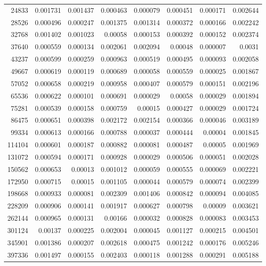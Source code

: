 \begin{tabular}{r r r r r r r r}
24833 & 0.001731 & 0.001437 & 0.000463 & 0.000079 & 0.000451 & 0.000171 & 0.002644 \\
28526 & 0.000496 & 0.000247 & 0.001375 & 0.001314 & 0.000372 & 0.000166 & 0.002242 \\
32768 & 0.001402 & 0.001023 & 0.00058 & 0.000153 & 0.000392 & 0.000152 & 0.002374 \\
37640 & 0.000559 & 0.000134 & 0.002061 & 0.002094 & 0.00048 & 0.000007 & 0.0031 \\
43237 & 0.000599 & 0.000259 & 0.000963 & 0.000519 & 0.000495 & 0.000093 & 0.002058 \\
49667 & 0.000619 & 0.000119 & 0.000689 & 0.000058 & 0.000559 & 0.000025 & 0.001867 \\
57052 & 0.000658 & 0.000219 & 0.000958 & 0.000407 & 0.000579 & 0.000151 & 0.002196 \\
65536 & 0.000622 & 0.000101 & 0.000691 & 0.000029 & 0.00058 & 0.000029 & 0.001894 \\
75281 & 0.000539 & 0.000158 & 0.000759 & 0.00015 & 0.000427 & 0.000029 & 0.001724 \\
86475 & 0.000651 & 0.000398 & 0.002172 & 0.002154 & 0.000366 & 0.000046 & 0.003189 \\
99334 & 0.000613 & 0.000166 & 0.000788 & 0.000037 & 0.000444 & 0.00004 & 0.001845 \\
114104 & 0.000601 & 0.000187 & 0.000882 & 0.000081 & 0.000487 & 0.00005 & 0.001969 \\
131072 & 0.000594 & 0.000171 & 0.000928 & 0.000029 & 0.000506 & 0.000051 & 0.002028 \\
150562 & 0.000653 & 0.00013 & 0.001012 & 0.000059 & 0.000555 & 0.000069 & 0.002221 \\
172950 & 0.000715 & 0.00015 & 0.001105 & 0.000044 & 0.000579 & 0.000074 & 0.002399 \\
198668 & 0.000933 & 0.000081 & 0.002309 & 0.001406 & 0.000842 & 0.000094 & 0.004085 \\
228209 & 0.000906 & 0.000141 & 0.001917 & 0.000627 & 0.000798 & 0.00009 & 0.003621 \\
262144 & 0.000965 & 0.000131 & 0.00166 & 0.000032 & 0.000828 & 0.000083 & 0.003453 \\
301124 & 0.00137 & 0.000225 & 0.002004 & 0.000045 & 0.001127 & 0.000215 & 0.004501 \\
345901 & 0.001386 & 0.000207 & 0.002618 & 0.000475 & 0.001242 & 0.000176 & 0.005246 \\
397336 & 0.001497 & 0.000155 & 0.002403 & 0.000118 & 0.001288 & 0.000291 & 0.005188 \\

\end{tabular}
